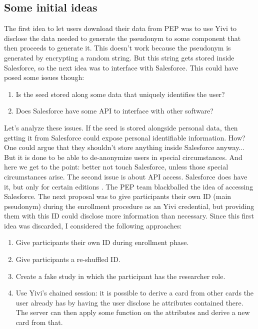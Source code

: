 \documentclass{report}
\begin{document}
\subsection{Some initial ideas}
The first idea to let users download their data from PEP was to use Yivi to disclose the data needed to generate the pseudonym to some component that then proceeds to generate it.
This doesn't work because the pseudonym is generated by encrypting a random string. But this string gets stored inside Salesforce, so the next idea was to interface with
Salesforce. This could have posed some issues though:
\begin{enumerate}
		\item Is the seed stored along some data that uniquely identifies the user?
		\item Does Salesforce have some API to interface with other software?
\end{enumerate}
Let's analyze these issues. If the seed is stored alongside personal data, then getting it from Salesforce could expose personal identifiable information. How? One could argue that
they shouldn't store anything inside Salesforce anyway... But it is done to be able to de-anonymize users in special circumstances. And here we get to the point: better not touch
Salesforce, unless those special circumstances arise. The second issue is about API access. Salesforce does have it, but only for certain editions \cite{salesforce}. The PEP team
blackballed the idea of accessing Salesforce. The next proposal was to give participants their own ID (main pseudonym) during the enrollment procedure as an Yivi credential, but
providing them with this ID could disclose more information than necessary.
Since this first idea was discarded, I considered the following approaches:
\begin{enumerate}
		\item Give participants their own ID during enrollment phase.
		\item Give participants a re-shuffled ID.
		\item Create a fake study in which the participant has the researcher role.
		\item Use Yivi’s chained session: it is possible to derive a card from other cards the user already has by having the user disclose he attributes contained there. The server can then apply some function on the attributes and derive a new card from that.
\end{enumerate}
\end{document}
